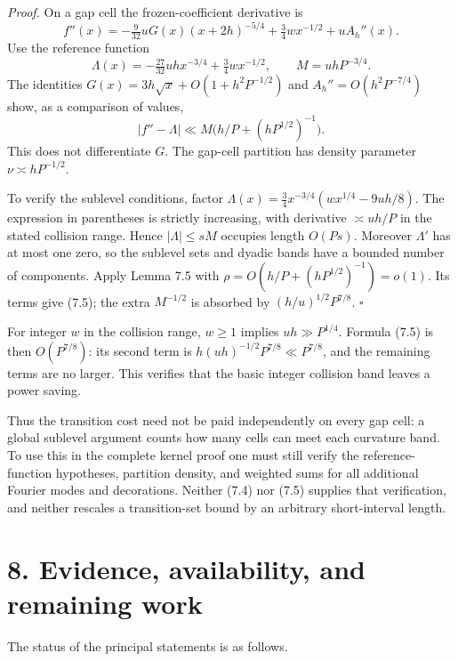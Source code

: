 \documentclass[11pt,a4paper]{article}
\begin{document}
\emph{Proof.} On a gap cell the frozen-coefficient derivative is \[
f''(x)=-\tfrac9{32}uG(x)(x+2h)^{-5/4}
+\tfrac34wx^{-1/2}+uA_h''(x).
\] Use the reference function \[
\Lambda(x)=-\tfrac{27}{32}uhx^{-3/4}+\tfrac34wx^{-1/2},
\qquad M=uhP^{-3/4}.
\] The identities \(G(x)=3h\sqrt x+O(1+h^2P^{-1/2})\) and
\(A_h''=O(h^2P^{-7/4})\) show, as a comparison of values, \[
|f''-\Lambda|\ll M\bigl(h/P+(hP^{1/2})^{-1}\bigr).
\] This does not differentiate \(G\). The gap-cell partition has density
parameter \(\nu\asymp hP^{-1/2}\).

To verify the sublevel conditions, factor
\(\Lambda(x)=\tfrac34x^{-3/4}(wx^{1/4}-9uh/8)\). The expression in
parentheses is strictly increasing, with derivative \(\asymp uh/P\) in
the stated collision range. Hence \(|\Lambda|\le sM\) occupies length
\(O(Ps)\). Moreover \(\Lambda'\) has at most one zero, so the sublevel
sets and dyadic bands have a bounded number of components. Apply Lemma
7.5 with \(\rho=O(h/P+(hP^{1/2})^{-1})=o(1)\). Its terms give (7.5); the
extra \(M^{-1/2}\) is absorbed by \((h/u)^{1/2}P^{7/8}\). \(\square\)

For integer \(w\) in the collision range, \(w\ge1\) implies
\(uh\gg P^{1/4}\). Formula (7.5) is then \(O(P^{7/8})\): its second term
is \(h(uh)^{-1/2}P^{7/8}\ll P^{7/8}\), and the remaining terms are no
larger. This verifies that the basic integer collision band leaves a
power saving.

Thus the transition cost need not be paid independently on every gap
cell: a global sublevel argument counts how many cells can meet each
curvature band. To use this in the complete kernel proof one must still
verify the reference-function hypotheses, partition density, and
weighted sums for all additional Fourier modes and decorations. Neither
(7.4) nor (7.5) supplies that verification, and neither rescales a
transition-set bound by an arbitrary short-interval length.

\section{8. Evidence, availability, and remaining
work}\label{evidence-availability-and-remaining-work}

The status of the principal statements is as follows.

\begingroup\small
\end{document}

